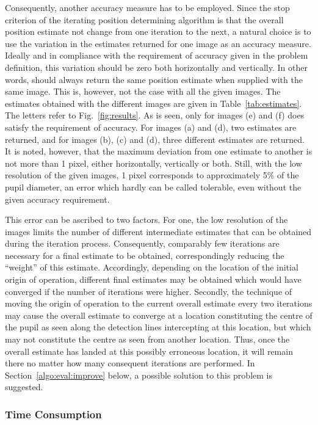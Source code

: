 Consequently, another accuracy measure has to be employed.  Since the
stop criterion of the iterating position determining algorithm is that
the overall position estimate not change from one iteration to the
next, a natural choice is to use the variation in the estimates
returned for one image as an accuracy measure.  Ideally and in
compliance with the requirement of accuracy given in the problem
definition, this variation should be zero both horizontally and
vertically.  In other words, {\octopus} should always return the same
position estimate when supplied with the same image.  This is,
however, not the case with all the given images.  The estimates
obtained with the different images are given in
Table~\ref{tab:estimates}.  The letters refer to
Fig.~\ref{fig:results}.  As is seen, only for images (e) and (f) does
{\octopus} satisfy the requirement of accuracy.  For images (a) and
(d), two estimates are returned, and for images (b), (c) and (d),
three different estimates are returned.  It is noted, however, that
the maximum deviation from one estimate to another is not more than 1
pixel, either horizontally, vertically or both.  Still, with the low
resolution of the given images, 1 pixel corresponds to approximately
5\% of the pupil diameter, an error which hardly can be called
tolerable, even without the given accuracy requirement.

This error can be ascribed to two factors.  For one, the low
resolution of the images limits the number of different intermediate
estimates that can be obtained during the iteration process.
Consequently, comparably few iterations are necessary for a final
estimate to be obtained, correspondingly reducing the ``weight'' of
this estimate.  Accordingly, depending on the location of the initial
origin of operation, different final estimates may be obtained which
would have converged if the number of iterations were higher.
Secondly, the technique of moving the origin of operation to the
current overall estimate every two iterations may cause the overall
estimate to converge at a location constituting the centre of the
pupil as seen along the detection lines intercepting at this location,
but which may not constitute the centre as seen from another location.
Thus, once the overall estimate has landed at this possibly erroneous
location, it will remain there no matter how many consequent
iterations are performed.  In Section~\ref{algo:eval:improve} below, a
possible solution to this problem is suggested.

\subsubsection{Time Consumption}

